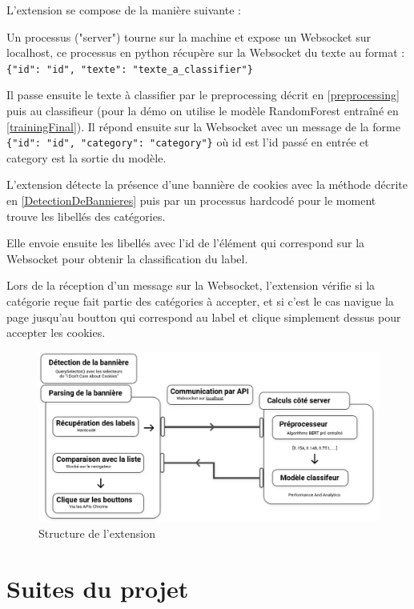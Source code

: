 \documentclass[oneside,a4paper,12pt]{article}
\begin{document}
	L'extension se compose de la manière suivante :
	
	Un processus ("server") tourne sur la machine et expose un Websocket sur localhost, ce processus en python récupère sur la Websocket du texte au format : \lstinline|{"id": "id", "texte": "texte_a_classifier"}|
	
	Il passe ensuite le texte à classifier par le preprocessing décrit en \ref{preprocessing} puis au classifieur (pour la démo on utilise le modèle RandomForest entraîné en \ref{trainingFinal}). Il répond ensuite sur la Websocket avec un message de la forme \lstinline|{"id": "id", "category": "category"}| o\`u id est l'id passé en entrée et category est la sortie du modèle.
	
	L'extension détecte la présence d'une bannière de cookies avec la méthode décrite en \ref{DetectionDeBannieres} puis par un processus hardcodé pour le moment trouve les libellés des catégories.
	
	Elle envoie ensuite les libellés avec l'id de l'élément qui correspond sur la Websocket pour obtenir la classification du label.
	
	\label{Interaction}
	Lors de la réception d'un message sur la Websocket, l'extension vérifie si la catégorie reçue fait partie des catégories à accepter, et si c'est le cas navigue la page jusqu'au boutton qui correspond au label et clique simplement dessus pour accepter les cookies.
	
	\begin{figure}[h]
		\centering
		\includegraphics[width=\linewidth]{structure.png}
		\caption{Structure de l'extension}
	\end{figure}

	\section{Suites du projet}
	
\end{document}
